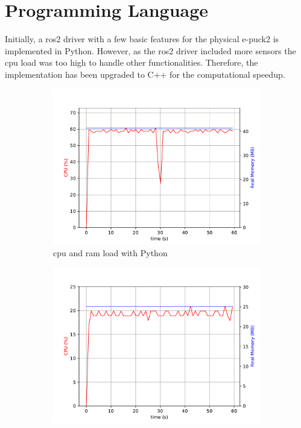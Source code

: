 
\section{Programming Language}
Initially, a \ac{ros2} driver with a few basic features for the physical e-puck2 is implemented in Python.
However, as the \ac{ros2} driver included more sensors the \ac{cpu} load was too high to handle other functionalities. Therefore, the implementation has been upgraded to C++ for the computational speedup.

\begin{figure}[H]
\centering
\begin{subfigure}{.8\textwidth}
  \centering
  \includegraphics[width=\linewidth]{physical/figures/rpi_py_32ms}
  \caption{\ac{cpu} and \ac{ram} load with Python}
  \label{fig:physical:py_vs_cpp:py}
\end{subfigure}
\begin{subfigure}{.8\textwidth}
  \centering
  \includegraphics[width=\linewidth]{physical/figures/rpi_cpp_32ms}

\end{subfigure}
\end{figure}
